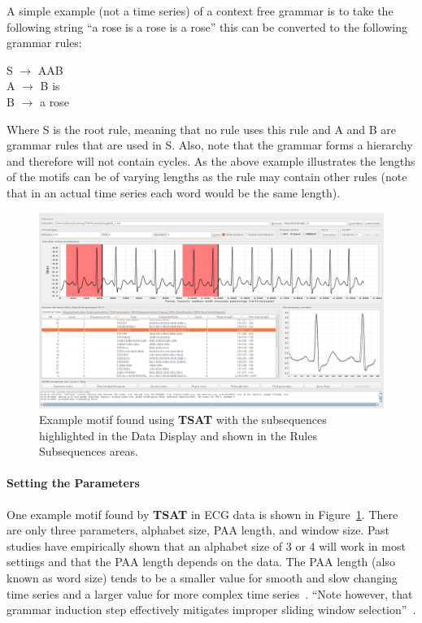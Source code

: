 \documentclass[titlepage, letterpaper, 12pt]{article}
\newcommand\TSAT{\textbf{TSAT}}
\begin{document}
A simple example (not a time series) of a context free grammar is to take the following string ``a rose is a rose is a rose'' this can be converted to the following grammar rules:

\begin{center}
	S \(\rightarrow\) AAB\\
	A \(\rightarrow\) B is\\
	B \(\rightarrow\) a rose\\
\end{center}
Where S is the root rule, meaning that no rule uses this rule and A and B are grammar rules that are used in S. Also, note that the grammar forms a hierarchy and therefore will not contain cycles.  As the above example illustrates the lengths of the motifs can be of varying lengths as the rule may contain other rules (note that in an actual time series each word would be the same length).
\begin{figure}[H]
	\includegraphics[width=\textwidth]{pictures/TSAT-example-motif}
	\caption{Example motif found using {\TSAT} with the subsequences highlighted in the Data Display and shown in the Rules Subsequences areas.}
	\label{fig:tsat-example-motif}
\end{figure}
\paragraph{Setting the Parameters}One example motif found by {\TSAT} in ECG data is shown in Figure~\ref{fig:tsat-example-motif}.  There are only three parameters, alphabet size, PAA length, and window size.  Past studies have empirically shown that an alphabet size of 3 or 4 will work in most settings and that the PAA length depends on the data.  The PAA length (also known as word size) tends to be a smaller value for smooth and slow changing time series and a larger value for more complex time series~\cite{keogh2004hot}. ``Note however, that grammar induction step effectively mitigates improper sliding window selection''~\cite{motifSite}.
\end{document}
